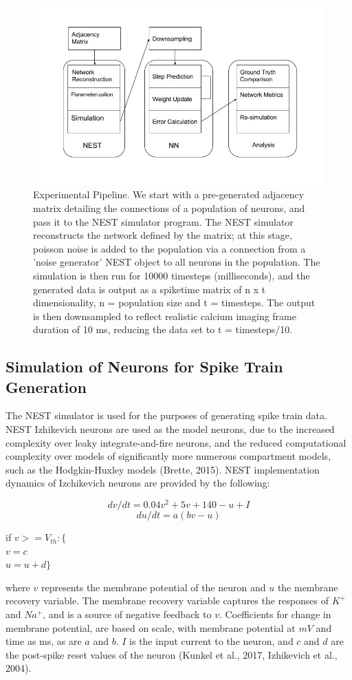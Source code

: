 \documentclass[11pt]{article}
\begin{document}
\begin{figure}[H]
\centering
	\includegraphics[scale=0.4]{./Figures/SPROJModel.jpg}
	\caption{Experimental Pipeline. We start with a pre-generated adjacency matrix detailing the connections of a population of neurons, and pass it to the NEST simulator program. The NEST simulator reconstructs the network defined by the matrix; at this stage, poisson noise is added to the population via a connection from a 'noise generator' NEST object to all neurons in the population. The simulation is then run for 10000 timesteps (milliseconds), and the generated data is output as a spiketime matrix of n x t dimensionality, n = population size and t = timesteps. The output is then downsampled to reflect realistic calcium imaging frame duration of 10 ms, reducing the data set to t = timesteps/10.}
\end{figure}

\subsection{Simulation of Neurons for Spike Train Generation}
The NEST simulator is used for the purposes of generating spike train data. NEST Izhikevich neurons are used as the model neurons, due to the increased complexity over leaky integrate-and-fire neurons, and the reduced computational complexity over models of significantly more numerous compartment models, such as the Hodgkin-Huxley models (Brette, 2015). NEST implementation dynamics of Izchikevich neurons are provided by the following:

$$dv/dt=0.04v^2+5v+140-u+I$$
$$du/dt=a(bv-u)$$
\smallskip

{\centering
if $v >= V_{th}:\{$\\
$v = c$\\
$u = u + d\}$\par
}
where $v$ represents the membrane potential of the neuron and $u$ the membrane recovery variable. The membrane recovery variable captures the responses of $K^{+}$ and $Na^{+}$, and is a source of negative feedback to $v$. Coefficients for change in membrane potential, are based on scale, with membrane potential at $mV$ and time as ms, as are $a$ and $b$. $I$ is the input current to the neuron, and $c$ and $d$ are the post-spike reset values of the neuron (Kunkel et al., 2017, Izhikevich et al., 2004). 
\end{document}
